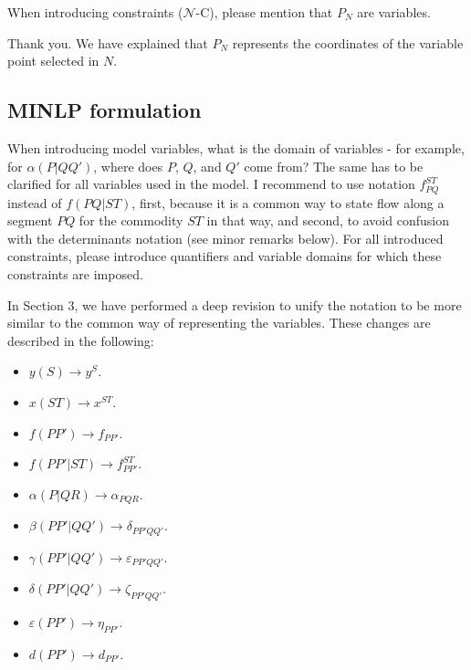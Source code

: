 \documentclass{article}
\newenvironment{reviewer}{\setcounter{pointcounter}{1}}{}
\newcommand{\point}{\text{{\selectfont \thepointcounter} \stepcounter{pointcounter}}}
\begin{document}
\begin{reviewer}
		\begin{itshape}
			When introducing constraints ($\mathcal N$-C), please mention that $P_N$ are variables.
		\end{itshape}
		
		\begin{tcolorbox}[breakable,enhanced,coltitle=black,colback=green!5!white,colframe=green!75!black,title=\textbf{Answer R2.\point},borderline={1pt}{0pt}{black},boxrule=0pt]
			Thank you. We have explained that $P_N$ represents the coordinates of the variable point selected in $N$.
		\end{tcolorbox}
		
		\subsection*{MINLP formulation}
		\begin{itshape}
			When introducing model variables, what is the domain of variables - for example, for $\alpha(P|QQ')$, where does $P$, $Q$, and $Q'$ come from? The same has to be clarified for all variables used in the model. I recommend to use notation $f^{ST}_{PQ}$ instead of $f(PQ|ST)$, first, because it is a common way to state flow along a segment $PQ$ for the commodity $ST$ in that way, and second, to avoid confusion with the determinants notation (see minor remarks below). For all introduced constraints, please introduce quantifiers and variable domains for which these constraints are imposed.
		\end{itshape}
		
		\begin{tcolorbox}[breakable,enhanced,coltitle=black,colback=green!5!white,colframe=green!75!black,title=\textbf{Answer R2.\point},borderline={1pt}{0pt}{black},boxrule=0pt]
			In Section 3, we have performed a deep revision to unify the notation to be more similar to the common way of representing the variables. These changes are described in the following:
			\begin{itemize}
				\item $y(S)\rightarrow y^S$.
				\item $x(ST)\rightarrow x^{ST}$.
				\item $f(PP')\rightarrow f_{PP'}$.
				\item $f(PP'|ST)\rightarrow f_{PP'}^{ST}$.
				\item $\alpha(P|QR)\rightarrow \alpha_{PQR}$.
				\item $\beta(PP'|QQ')\rightarrow \delta_{PP'QQ'}$.
				\item $\gamma(PP'|QQ')\rightarrow \varepsilon_{PP'QQ'}$.
				\item $\delta(PP'|QQ')\rightarrow \zeta_{PP'QQ'}$.
				\item $\varepsilon(PP')\rightarrow \eta_{PP'}$.
				\item $d(PP')\rightarrow d_{PP'}$.
			\end{itemize}
			

\end{tcolorbox}
\end{reviewer}
\end{document}
